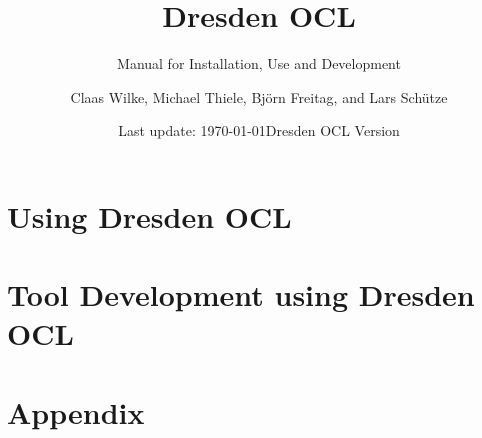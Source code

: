 


\title{Dresden OCL}
\subtitle{Manual for Installation, Use and Development}
\author{Claas Wilke, Michael Thiele,
	Bj\"{o}rn Freitag, and Lars Sch\"{u}tze}
\date{Last update: \today\newline Dresden OCL Version \dresdenoclversion}


\maketitle




\tableofcontents

\part{Using Dresden OCL}








\part{Tool Development using Dresden OCL}







%



\part{Appendix}
\appendix




